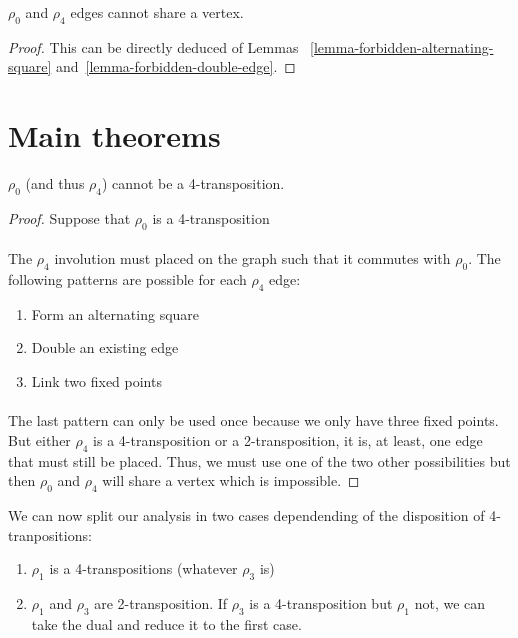 \begin{corollary}
  \label{0-4-no-share}
  $\rho_0$ and $\rho_4$ edges cannot share a vertex.
\end{corollary}

\begin{proof}
  This can be directly deduced of Lemmas ~\ref{lemma-forbidden-alternating-square} and~\ref{lemma-forbidden-double-edge}.
\end{proof}

\section{Main theorems}

\begin{lemma}
  $\rho_0$ (and thus $\rho_4$) cannot be a 4-transposition.
\end{lemma}

\begin{proof}
  Suppose that $\rho_0$ is a 4-transposition

  \paragraph{}
  The $\rho_4$ involution must placed on the graph such that it commutes with $\rho_0$. The following patterns are possible for each $\rho_4$ edge:
  \begin{enumerate}
    \item Form an alternating square
    \item Double an existing edge
    \item Link two fixed points
  \end{enumerate}

  \paragraph{}
  The last pattern can only be used once because we only have three fixed points. But either $\rho_4$ is a 4-transposition or a 2-transposition, it is, at least, one edge that must still be placed. Thus, we must use one of the two other possibilities but then $\rho_0$ and $\rho_4$ will share a vertex which is impossible.
\end{proof}

We can now split our analysis in two cases dependending of the disposition of 4-tranpositions:
\begin{enumerate}
  \item $\rho_1$ is a 4-transpositions (whatever $\rho_3$ is)
  \item $\rho_1$ and $\rho_3$ are 2-transposition. If $\rho_3$ is a 4-transposition but $\rho_1$ not, we can take the dual and reduce it to the first case.
\end{enumerate}

